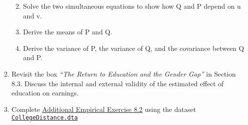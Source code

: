 \documentclass[11pt]{article}
\begin{document}
\begin{enumerate}
\begin{enumerate}
\def\labelenumi{\alph{enumi}.}

\item
  Solve the two simultaneous equations to show how Q and P depend on u
  and v.
\item
  Derive the means of P and Q.
\item
  Derive the variance of P, the variance of Q, and the covariance
  between Q and P.
\end{enumerate}


\item
  Revisit the box \emph{``The Return to Education and the Gender Gap''}
  in Section 8.3. Discuss the internal and external validity of the
  estimated effect of education on earnings.
\item
  Complete
  \href{https://www.princeton.edu/~mwatson/Stock-Watson_3u/Students/AEE/Stock_Watson_3U_AEE_8_2.pdf}{Additional
  Empirical Exercise 8.2} using the dataset
  \href{https://www.princeton.edu/~mwatson/Stock-Watson_3u/Students/EE_Datasets/CollegeDistance.dta}{\texttt{CollegeDistance.dta}}
\end{enumerate}
\end{document}
